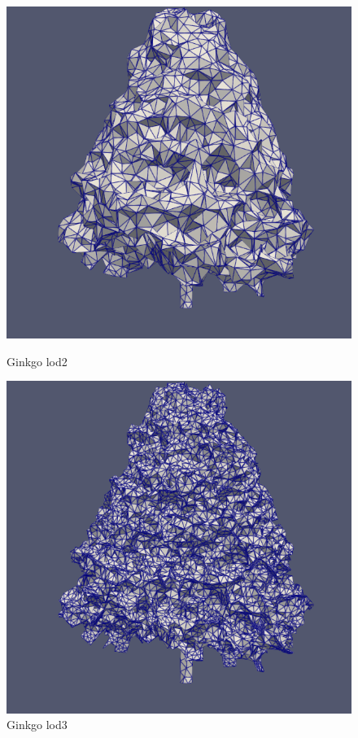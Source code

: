 \documentclass[12pt]{article}
\begin{document}
\begin{figure}[H]
    \centering
    \begin{minipage}{0.45\textwidth}
        \centering
        \includegraphics[width=1\textwidth]{images/tree-cone_lod2.png}
        \caption{Ginkgo lod2}
    \end{minipage}\hfill
    \begin{minipage}{0.45\textwidth}
        \centering
        \includegraphics[width=1\textwidth]{images/tree-cone_lod3.png}
        \caption{Ginkgo lod3}
    \end{minipage}
\end{figure}
\end{document}
